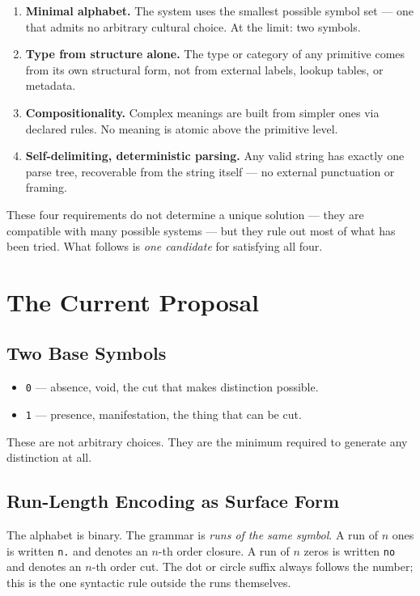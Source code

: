 \documentclass[11pt, letterpaper]{article}
\begin{document}
\begin{enumerate}[leftmargin=*, itemsep=0.4em]
    \item \textbf{Minimal alphabet.} The system uses the smallest possible symbol set --- one that admits no arbitrary cultural choice. At the limit: two symbols.
    \item \textbf{Type from structure alone.} The type or category of any primitive comes from its own structural form, not from external labels, lookup tables, or metadata.
    \item \textbf{Compositionality.} Complex meanings are built from simpler ones via declared rules. No meaning is atomic above the primitive level.
    \item \textbf{Self-delimiting, deterministic parsing.} Any valid string has exactly one parse tree, recoverable from the string itself --- no external punctuation or framing.
\end{enumerate}

These four requirements do not determine a unique solution --- they are compatible with many possible systems --- but they rule out most of what has been tried. What follows is \emph{one candidate} for satisfying all four.

\section{The Current Proposal}

\subsection{Two Base Symbols}

\begin{itemize}[leftmargin=*, itemsep=0.3em]
    \item \texttt{0} --- absence, void, the cut that makes distinction possible.
    \item \texttt{1} --- presence, manifestation, the thing that can be cut.
\end{itemize}

These are not arbitrary choices. They are the minimum required to generate any distinction at all.

\subsection{Run-Length Encoding as Surface Form}

The alphabet is binary. The grammar is \emph{runs of the same symbol}. A run of $n$ ones is written \texttt{n.} and denotes an $n$-th order closure. A run of $n$ zeros is written \texttt{no} and denotes an $n$-th order cut. The dot or circle suffix always follows the number; this is the one syntactic rule outside the runs themselves.
\end{document}
